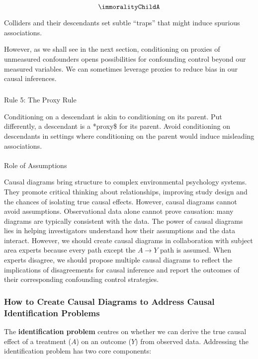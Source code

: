 \documentclass[
  singlecolumn]{article}
\makeatletter
\let\oldparagraph\paragraph
\renewcommand{\paragraph}{
    \@ifstar
      \xxxParagraphStar
      \xxxParagraphNoStar
  }
\newcommand{\xxxParagraphStar}[1]{\oldparagraph*{#1}\mbox{}}
\newcommand{\xxxParagraphNoStar}[1]{\oldparagraph{#1}\mbox{}}
\let\oldsubparagraph\subparagraph
\renewcommand{\subparagraph}{
    \@ifstar
      \xxxSubParagraphStar
      \xxxSubParagraphNoStar
  }
\newcommand{\xxxSubParagraphStar}[1]{\oldsubparagraph*{#1}\mbox{}}
\newcommand{\xxxSubParagraphNoStar}[1]{\oldsubparagraph{#1}\mbox{}}
\makeatother
\begin{document}
\[\immoralityChildA\]

Colliders and their descendants set subtle ``traps'' that might induce
spurious associations.

However, as we shall see in the next section, conditioning on proxies of
unmeasured confounders opens possibilities for confounding control
beyond our measured variables. We can sometimes leverage proxies to
reduce bias in our causal inferences.

\subparagraph{Rule 5: The Proxy Rule}\label{rule-5-the-proxy-rule}

Conditioning on a descendant is akin to conditioning on its parent. Put
differently, a descendant is a *proxy\$ for its parent. Avoid
conditioning on descendants in settings where conditioning on the parent
would induce misleading associations.

\paragraph{Role of Assumptions}\label{role-of-assumptions}

Causal diagrams bring structure to complex environmental psychology
systems. They promote critical thinking about relationships, improving
study design and the chances of isolating true causal effects. However,
causal diagrams cannot avoid assumptions. Observational data alone
cannot prove causation: many diagrams are typically consistent with the
data. The power of causal diagrams lies in helping investigators
understand how their assumptions and the data interact. However, we
should create causal diagrams in collaboration with subject area experts
because every path except the \(A\to Y\) path is assumed. When experts
disagree, we should propose multiple causal diagrams to reflect the
implications of disagreements for causal inference and report the
outcomes of their corresponding confounding control strategies.

\subsubsection{How to Create Causal Diagrams to Address Causal
Identification
Problems}\label{how-to-create-causal-diagrams-to-address-causal-identification-problems}

The \textbf{identification problem} centres on whether we can derive the
true causal effect of a treatment (\(A\)) on an outcome (\(Y\)) from
observed data. Addressing the identification problem has two core
components:
\end{document}
